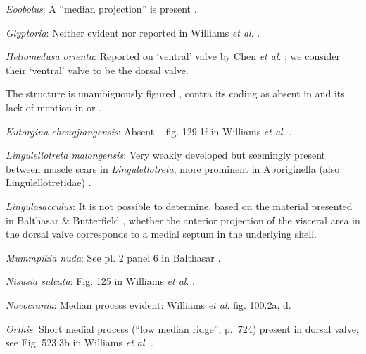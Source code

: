 \documentclass[openany]{book}
\begin{document}
\hypertarget{Eoobolus-coding-98}{}
\emph{Eoobolus}: A ``median projection'' is present \citep[fig. 4g
in][]{Balthasar2009Thebrachiopod}.

\hypertarget{Glyptoria-coding-98}{}
\emph{Glyptoria}: Neither evident nor reported in Williams \emph{et al}.
\citeyearpar{Williams2000LinguliformeaCraniiformea}.

\hypertarget{Heliomedusa_orienta-coding-98}{}
\emph{Heliomedusa orienta}: Reported on `ventral' valve by Chen \emph{et
al}. \citeyearpar{Chen2007Reinterpretationof}; we consider their
`ventral' valve to be the dorsal valve.

The structure is unambiguously figured \citep[e.g.~fig. 5.1
in][]{Chen2007Reinterpretationof}, contra its coding as absent in
\citet{Williams2000LinguliformeaCraniiformea} and its lack of mention in
\citet{Williams2007Supplement} or \citet{Zhang2009Architectureand}.

\hypertarget{Kutorgina_chengjiangensis-coding-98}{}
\emph{Kutorgina chengjiangensis}: Absent -- fig. 129.1f in Williams
\emph{et al}. \citeyearpar{Williams2000LinguliformeaCraniiformea}.

\hypertarget{Lingulellotreta_malongensis-coding-98}{}
\emph{Lingulellotreta malongensis}: Very weakly developed but seemingly
present between muscle scars in \emph{Lingulellotreta}, more prominent
in Aboriginella (also Lingulellotretidae) \citep[fig.
34]{Williams2000LinguliformeaCraniiformea}.

\hypertarget{Lingulosacculus-coding-98}{}
\emph{Lingulosacculus}: It is not possible to determine, based on the
material presented in Balthasar \& Butterfield
\citeyearpar{Balthasar2009EarlyCambrian}, whether the anterior
projection of the visceral area in the dorsal valve corresponds to a
medial septum in the underlying shell.

\hypertarget{Mummpikia_nuda-coding-98}{}
\emph{Mummpikia nuda}: See pl. 2 panel 6 in Balthasar
\citeyearpar{Balthasar2008iMummpikia}.

\hypertarget{Nisusia_sulcata-coding-98}{}
\emph{Nisusia sulcata}: Fig. 125 in Williams \emph{et al}.
\citeyearpar{Williams2000LinguliformeaCraniiformea}.

\hypertarget{Novocrania-coding-98}{}
\emph{Novocrania}: Median process evident: Williams \emph{et al}.
\citeyearpar{Williams2000LinguliformeaCraniiformea} fig. 100.2a, d.

\hypertarget{Orthis-coding-98}{}
\emph{Orthis}: Short medial process (``low median ridge'', p.~724)
present in dorsal valve; see Fig. 523.3b in Williams \emph{et al}.
\citeyearpar{Williams2000LinguliformeaCraniiformea}.
\end{document}
